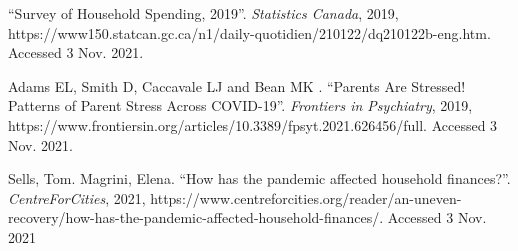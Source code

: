 \documentclass[fontsize=11pt]{article}
\begin{document}
    \begin{flushleft}
        \hangindent=1cm “Survey of Household Spending, 2019”. \textit{Statistics Canada}, 2019, https://www150.statcan.gc.ca/n1/daily-quotidien/210122/dq210122b-eng.htm.
        Accessed 3 Nov. 2021.
    \end{flushleft}


    \begin{flushleft}
        \hangindent=1cm Adams EL, Smith D, Caccavale LJ and Bean MK . “Parents Are Stressed! Patterns of Parent Stress Across COVID-19”. \textit{Frontiers in Psychiatry}, 2019, https://www.frontiersin.org/articles/10.3389/fpsyt.2021.626456/full. Accessed 3 Nov. 2021.
    \end{flushleft}


    \begin{flushleft}
        \hangindent=1cm Sells, Tom. Magrini, Elena. “How has the pandemic affected household finances?”. \textit{CentreForCities}, 2021, https://www.centreforcities.org/reader/an-uneven-recovery/how-has-the-pandemic-affected-household-finances/. Accessed 3 Nov. 2021
    \end{flushleft}


\end{document}
